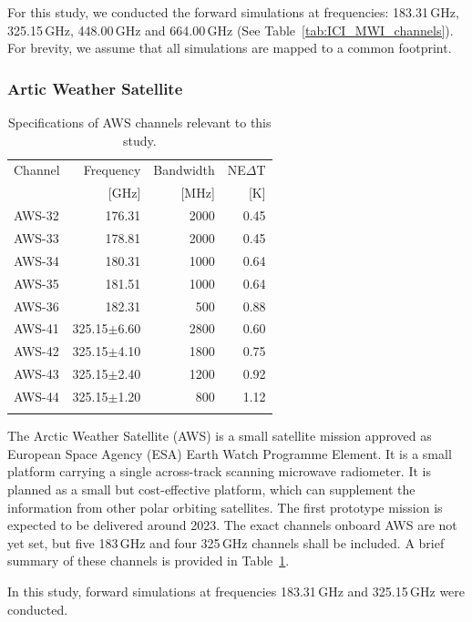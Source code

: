 \documentclass[amt, manuscript]{copernicus}
\begin{document}
For this study, we conducted the forward simulations at frequencies: 183.31\,GHz, 325.15\,GHz, 448.00\,GHz and 664.00\,GHz (See Table~\ref{tab:ICI_MWI_channels}). For brevity, we assume that all simulations are mapped to a common footprint.

\subsubsection{Artic Weather Satellite}
%
\begin{table}[t]
	\caption{Specifications of AWS channels relevant to this study.}
	\label{tab:specifications_AWS}	
	\begin{tabular}{lrrr}
		\tophline
		Channel & Frequency 	& Bandwidth & NE$\Delta$T \\
				& [GHz]			& [MHz]		& [K]		\\
		\middlehline
		AWS-32	&	176.31    & 2000	&	0.45	\\
		AWS-33	&	178.81    & 2000 	&	0.45\\
		AWS-34	&	180.31    & 1000 	&	0.64\\
		AWS-35	&	181.51    & 1000 	&	0.64 \\
		AWS-36	&	182.31    & \phantom{0}500  &	0.88 \\
		AWS-41  & 325.15$\pm$6.60    & 2800 	 &0.60\\
		AWS-42  & 325.15$\pm$4.10    & 1800    &0.75	\\
		AWS-43  & 325.15$\pm$2.40    & 1200    &0.92\\
		AWS-44  & 325.15$\pm$1.20    & \phantom{0}800  &1.12  \\
		\bottomhline
	\end{tabular}
	\belowtable{} %
\end{table}
The Arctic Weather Satellite (AWS) is a small satellite mission approved as European Space Agency (ESA)
Earth Watch Programme Element. It is a small platform carrying a single across-track scanning microwave radiometer. It is planned as a small but cost-effective platform, which can supplement the information from other polar orbiting satellites. The first prototype mission is expected to be delivered around 2023. The exact channels onboard AWS are not yet set, but five 183\,GHz and four 325\,GHz channels shall be included. A brief summary of these channels is provided in Table~\ref{tab:specifications_AWS}.
 
In this study, forward simulations at frequencies 183.31\,GHz and 325.15\,GHz were conducted. 
\end{document}
